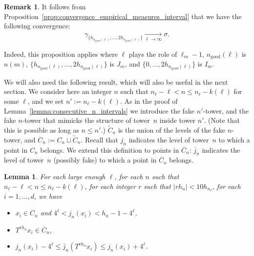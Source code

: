 \documentclass[10pt]{amsart}
\newtheorem{lemm}[theo]{Lemma}\newtheorem{prop}[theo]{Proposition}\newtheorem{coro}[theo]{Corollary}\newtheorem{conj}[theo]{Conjecture}
\theoremstyle{definition}\newtheorem{defi}[theo]{Definition}\newtheorem{rema}[theo]{Remark}\newtheorem{exam}[theo]{Example}\newtheorem{exem}[theo]{Example}\newtheorem{nota}[theo]{Notation}
\newcommand{\egdef}{:=}
\newcommand{\tend}[3][]{\xrightarrow[#2\to#3]{#1}}
\newcommand{\ngood}{n_{\text{good}}}
\begin{document}
\begin{rema}\label{rem:6.2}
It follows from Proposition~\ref{prop:convergence_empirical_measures_interval} that we have the following convergence:
\[
\gamma_{\{h_{\ngood(\ell)},\ldots,2h_{\ngood(\ell)}\}} \tend{\ell}{\infty} \sigma.
\]
\end{rema}

Indeed, this proposition applies where $\ell$ plays the role of $\ell_m-1$, $\ngood(\ell)$ is $n(m)$, $\{h_{\ngood(\ell)},\ldots,2h_{\ngood(\ell)}\}$ is $J_m$, and $\{0,\ldots,2h_{\ngood(\ell)}\}$ is $I_m$.


We will also need the following result, which will also be useful in the next section. We consider here an integer $n$ such that $n_\ell-\ell< n \le n_\ell-k(\ell)$ for some $\ell$, and we set $n'\egdef n_\ell-k(\ell)$. As in the proof of Lemma~\ref{lemma:consecutive_n_intervals} we introduce the fake $n'$-tower, and the fake $n$-tower that mimicks the structure of tower~$n$ inside tower $n'$. (Note that this is possible as long as $n\le n'$.) $\tilde C_n$ is the union of the levels of the fake $n$-tower, and $\overline{C}_n\egdef C_n\sqcup\tilde C_n$. Recall that $j_n$ indicates the level of tower~$n$ to which a point in $C_n$ belongs. We extend this definition to points in $\overline{C}_n$: $\overline{j}_n$ indicates the level of tower~$n$ (possibly fake) to which a point in $\overline{C}_n$ belongs.

\begin{lemm}\label{lemma:shifting}
For each large enough $\ell$, for each $n$ such that $n_\ell-\ell< n \le n_\ell-k(\ell)$, for each integer $r$ such that $|rh_n|<10 h_{n_\ell}$, for each $i=1,\ldots,d$, we have
\begin{itemize}
\item $x_i\in C_n$ and $4^\ell<j_n(x_i)<h_n-1-4^\ell$,
\item $T^{rh_n}x_i\in \overline{C}_n$,
\item $j_n(x_i)-4^\ell\le\overline{j}_n \left(T^{rh_n} x_i\right)\le j_n(x_i)+4^\ell$.
\end{itemize}
\end{lemm}
\end{document}

